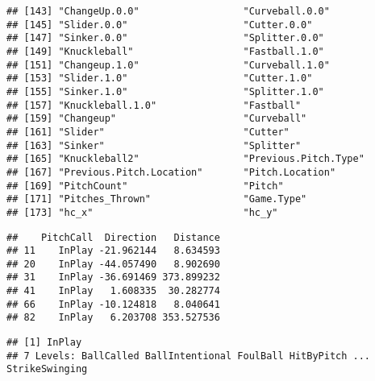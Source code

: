 \documentclass[]{article}
\newenvironment{Shaded}{\begin{snugshade}}{\end{snugshade}}
\newcommand{\KeywordTok}[1]{\textcolor[rgb]{0.13,0.29,0.53}{\textbf{#1}}}
\newcommand{\StringTok}[1]{\textcolor[rgb]{0.31,0.60,0.02}{#1}}
\newcommand{\OperatorTok}[1]{\textcolor[rgb]{0.81,0.36,0.00}{\textbf{#1}}}
\newcommand{\NormalTok}[1]{#1}
\begin{document}
\begin{verbatim}
## [143] "ChangeUp.0.0"                  "Curveball.0.0"                
## [145] "Slider.0.0"                    "Cutter.0.0"                   
## [147] "Sinker.0.0"                    "Splitter.0.0"                 
## [149] "Knuckleball"                   "Fastball.1.0"                 
## [151] "Changeup.1.0"                  "Curveball.1.0"                
## [153] "Slider.1.0"                    "Cutter.1.0"                   
## [155] "Sinker.1.0"                    "Splitter.1.0"                 
## [157] "Knuckleball.1.0"               "Fastball"                     
## [159] "Changeup"                      "Curveball"                    
## [161] "Slider"                        "Cutter"                       
## [163] "Sinker"                        "Splitter"                     
## [165] "Knuckleball2"                  "Previous.Pitch.Type"          
## [167] "Previous.Pitch.Location"       "Pitch.Location"               
## [169] "PitchCount"                    "Pitch"                        
## [171] "Pitches_Thrown"                "Game.Type"                    
## [173] "hc_x"                          "hc_y"
\end{verbatim}

\begin{Shaded}
\end{Shaded}

\begin{verbatim}
##    PitchCall  Direction   Distance
## 11    InPlay -21.962144   8.634593
## 20    InPlay -44.057490   8.902690
## 31    InPlay -36.691469 373.899232
## 41    InPlay   1.608335  30.282774
## 66    InPlay -10.124818   8.040641
## 82    InPlay   6.203708 353.527536
\end{verbatim}

\begin{Shaded}
\end{Shaded}

\begin{verbatim}
## [1] InPlay
## 7 Levels: BallCalled BallIntentional FoulBall HitByPitch ... StrikeSwinging
\end{verbatim}
\end{document}
